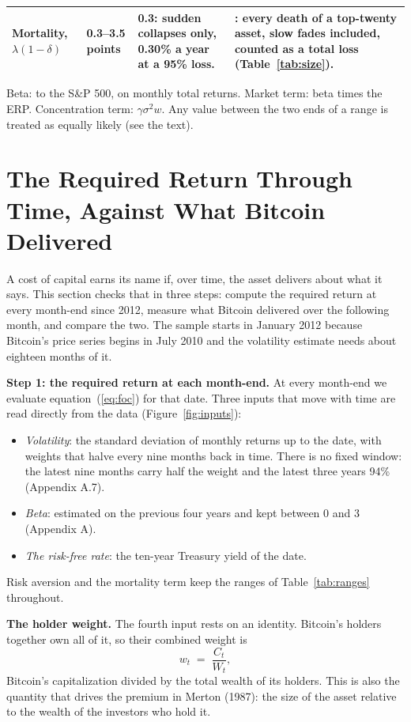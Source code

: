 \documentclass[11pt]{article}
\begin{document}
\begin{table}[ht]
\begin{tabular}{@{}>{\raggedright}p{}>{\raggedright}p{}>{\raggedright}p{}>{\raggedright\arraybackslash}p{}@{}}
\addlinespace
Mortality, $\lambda(1-\delta)$ & \textbf{0.3--3.5 points} & 0.3: sudden collapses only, 0.30\% a year at a 95\% loss. & 3.5: every death of a top-twenty asset, slow fades included, counted as a total loss (Table~\ref{tab:size}). \\
\bottomrule
\end{tabular}
\par\smallskip\begin{minipage}{0.97\textwidth}\footnotesize Beta: to the S\&P 500, on monthly total returns. Market term: beta times the ERP. Concentration term: $\gamma\sigma^{2}w$. Any value between the two ends of a range is treated as equally likely (see the text).\end{minipage}
\end{table}

\section{The Required Return Through Time, Against What Bitcoin Delivered}

A cost of capital earns its name if, over time, the asset delivers about what it says. This section checks that in three steps: compute the required return at every month-end since 2012, measure what Bitcoin delivered over the following month, and compare the two. The sample starts in January 2012 because Bitcoin's price series begins in July 2010 and the volatility estimate needs about eighteen months of it.

\textbf{Step 1: the required return at each month-end.} At every month-end we evaluate equation~(\ref{eq:foc}) for that date. Three inputs that move with time are read directly from the data (Figure~\ref{fig:inputs}):
\begin{itemize}
\item \emph{Volatility}: the standard deviation of monthly returns up to the date, with weights that halve every nine months back in time. There is no fixed window: the latest nine months carry half the weight and the latest three years 94\% (Appendix A.7).
\item \emph{Beta}: estimated on the previous four years and kept between 0 and 3 (Appendix A).
\item \emph{The risk-free rate}: the ten-year Treasury yield of the date.
\end{itemize}
Risk aversion and the mortality term keep the ranges of Table~\ref{tab:ranges} throughout.

\textbf{The holder weight.} The fourth input rests on an identity. Bitcoin's holders together own all of it, so their combined weight is
\begin{equation}
w_t \;=\; \frac{C_t}{W_t},
\label{eq:w}
\end{equation}
Bitcoin's capitalization divided by the total wealth of its holders. This is also the quantity that drives the premium in Merton (1987): the size of the asset relative to the wealth of the investors who hold it.
\end{document}
